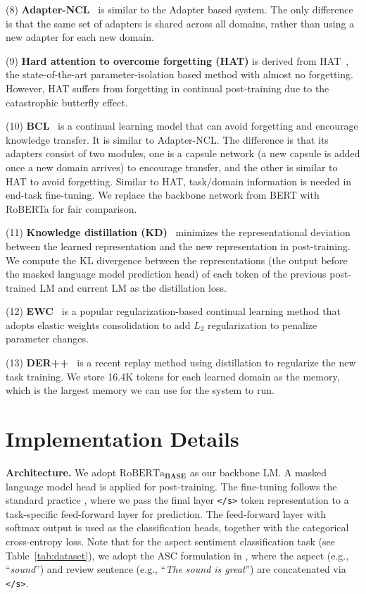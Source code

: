 \documentclass[11pt]{article}
\begin{document}
(8) \textbf{Adapter-NCL}~\cite{Houlsby2019Parameter} is similar to the Adapter based system. The only difference is that the same set of adapters is shared across all domains, rather than using a new adapter for each new domain.



(9) \textbf{Hard attention to overcome forgetting (HAT)} is derived from HAT~\cite{Serra2018overcoming}, the state-of-the-art parameter-isolation based method with almost no forgetting. {\color{black} However, HAT suffers from forgetting in continual post-training due to the catastrophic butterfly effect.}


(10) \textbf{BCL}~\cite{ke2021adapting} is a continual learning model that can avoid forgetting and encourage knowledge transfer. It is similar to Adapter-NCL. The difference is that its adapters consist of two modules, one is a capsule network (a new capsule is added once a new domain arrives) to encourage transfer, and the other is similar to HAT to avoid forgetting. Similar to HAT, task/domain information is needed in end-task fine-tuning. We replace the backbone network from BERT with RoBERTa for fair comparison. 



(11) \textbf{Knowledge distillation (KD)}~\cite{hinton2015distilling}
minimizes the representational deviation between the learned representation and the new representation in post-training. We
compute the KL divergence between the representations (the output before the masked language model prediction head) of each token of the previous post-trained LM and current LM as the distillation loss.

(12) \textbf{EWC}~\cite{buzzega2020dark} is a popular
regularization-based continual learning method that adopts elastic weights consolidation to add $L_2$ regularization to penalize parameter changes.

(13) \textbf{DER++}~\cite{buzzega2020dark} is a recent replay method using distillation to regularize the new task training. We store 16.4K tokens for each learned domain as the memory, which is the largest memory we can use for the system to run.

\iffalse
\section{Implementation Details}
\label{sec:imp_detail}

\textbf{Architecture.} We adopt $\text{RoBERTa}_{\textbf{BASE}}$ as our backbone LM. A masked language model head is applied for post-training. The fine-tuning follows the standard practice \cite{DBLP:conf/naacl/DevlinCLT19}, where we pass the final layer \texttt{</s>} token representation to a task-specific feed-forward layer for prediction. The feed-forward layer with softmax output is used as the classification heads, together with the categorical cross-entropy loss. Note that for the aspect sentiment classification task (see Table~\ref{tab:dataset}), we adopt the ASC formulation in \cite{DBLP:conf/naacl/XuLSY19}, where the aspect (e.g., ``\textit{sound}'') and review sentence (e.g., ``\textit{The sound is great}'') are concatenated via \texttt{</s>}. 
\end{document}
